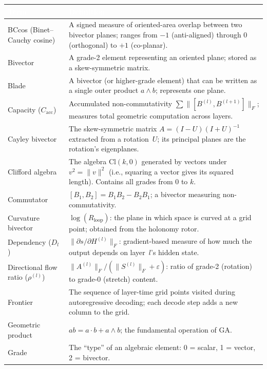 \documentclass[11pt, twoside, openright]{memoir}
\newcommand{\ip}{\cdot}           %
\newcommand{\op}{\wedge}          %
\numberwithin{equation}{chapter}
\begin{document}
\begin{center}
\renewcommand{\arraystretch}{1.5}\small
\begin{tabular}{@{}L{4cm} L{7.5cm}@{}}
\toprule
{}
\textcolor{white}{\textbf{Term}} &
\textcolor{white}{\textbf{Definition}} \\
\midrule
BCcos (Binet--Cauchy cosine) &
  A signed measure of oriented-area overlap between two bivector planes;
  ranges from $-1$ (anti-aligned) through $0$ (orthogonal) to $+1$ (co-planar). \\
Bivector &
  A grade-2 element representing an oriented plane; stored as a
  skew-symmetric matrix. \\
Blade &
  A bivector (or higher-grade element) that can be written as a single
  outer product $a \op b$; represents one plane. \\
Capacity ($C_{\mathrm{acc}}$) &
  Accumulated non-commutativity $\sum \|[B^{(l)}, B^{(l+1)}]\|_F$;
  measures total geometric computation across layers. \\
Cayley bivector &
  The skew-symmetric matrix $A = (I - U)(I + U)^{-1}$ extracted from
  a rotation~$U$; its principal planes are the rotation's eigenplanes. \\
Clifford algebra &
  The algebra $\mathrm{Cl}(k, 0)$ generated by vectors under
  $v^2 = \|v\|^2$ (i.e., squaring a vector gives its squared length).  Contains all grades from 0 to $k$. \\
Commutator &
  $[B_1, B_2] = B_1 B_2 - B_2 B_1$; a bivector measuring
  non-commutativity. \\
Curvature bivector &
  $\log(R_{\text{loop}})$: the plane in which space is curved at a
  grid point; obtained from the holonomy rotor. \\
Dependency ($D_l$) &
  $\|\partial s / \partial H^{(l)}\|_F$: gradient-based measure of how
  much the output depends on layer~$l$'s hidden state. \\
Directional flow ratio ($\rho^{(l)}$) &
  $\|A^{(l)}\|_F / (\|S^{(l)}\|_F + \varepsilon)$: ratio of
  grade-2 (rotation) to grade-0 (stretch) content. \\
Frontier &
  The sequence of layer-time grid points visited during autoregressive
  decoding; each decode step adds a new column to the grid. \\
Geometric product &
  $ab = a \ip b + a \op b$; the fundamental operation of GA. \\
Grade &
  The ``type'' of an algebraic element: 0 = scalar, 1 = vector,
  2 = bivector. \\

\end{tabular}
\end{center}
\end{document}
